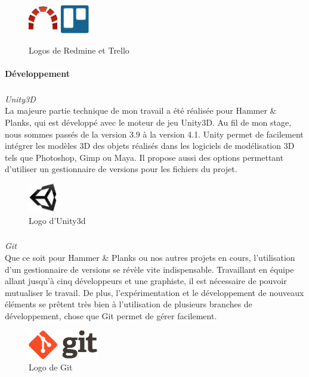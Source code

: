 	\begin{figure}[!h]
		\centering
		\includegraphics[height=48px]{images/redmine.jpg}
		\includegraphics[height=48px]{images/trello.jpg}
		\caption{Logos de Redmine et Trello}
		\label{Logos de Redmine et Trello}
	\end{figure}

		\paragraph{Développement}
		\subparagraph{} \emph{Unity3D\\}
La majeure partie technique de mon travail a été réalisée pour Hammer \& Planks, qui est développé avec le moteur de jeu Unity3D. Au fil de mon stage, nous sommes passés de la version 3.9 à la version 4.1. Unity permet de facilement intégrer les modèles 3D des objets réalisés dans les logiciels de modélisation 3D tels que Photoshop, Gimp ou Maya. Il propose aussi des options permettant d'utiliser un gestionnaire de versions pour les fichiers du projet.
	\begin{figure}[!h]
		\centering
		\includegraphics[height=48px]{images/unity.jpg}
		\caption{Logo d'Unity3d}
		\label{Logo d'Unity3d}
	\end{figure}

		\subparagraph{} \emph{Git\\}
Que ce soit pour Hammer \& Planks ou nos autres projets en cours, l'utilisation d'un gestionnaire de versions se révèle vite indispensable. Travaillant en équipe allant jusqu'à cinq développeurs et une graphiste, il est nécessaire de pouvoir mutualiser le travail. De plus, l'expérimentation et le développement de nouveaux éléments se prêtent très bien à l'utilisation de plusieurs branches de développement, chose que Git permet de gérer facilement.
	\begin{figure}[!h]
		\centering
		\includegraphics[height=48px]{images/git.png}
		\caption{Logo de Git}
		\label{Logo de Git}
	\end{figure}

